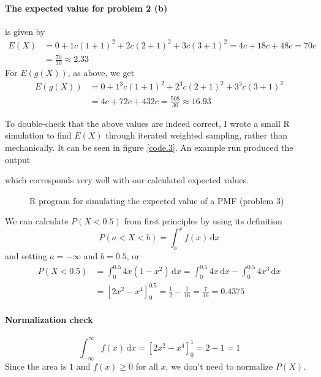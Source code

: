 \documentclass[a4paper,english,12pt]{article}
\begin{document}
\paragraph{The expected value for problem 2 (b)} is given by
\begin{align*}
  E(X) &=
    0 +
    1 c(1+1)^2 +
    2 c(2+1)^2 +
    3 c(3+1)^2 =
    4c + 18c + 48c = 70c \\
    &= \frac{70}{30} \approx 2.33
\end{align*}
For $E(g(X))$, as above, we get
\begin{align*}
  E(g(X)) &=
    0 +
    1^3 c(1+1)^2 +
    2^3 c(2+1)^2 +
    3^3 c(3+1)^2 \\
    &=  4c + 72c + 432c = \frac{508}{30} \approx 16.93
\end{align*}

To double-check that the above values are indeed correct, I wrote a small R
simulation to find $E(X)$ through iterated weighted sampling, rather than
mechanically. It can be seen in figure \vref{code.3}.
%
An example run produced the output

which corresponds very well with our calculated expected values.

\begin{figure}[t]
  
  \caption{R program for simulating the expected value of a PMF (problem 3)}
  \label{code.3}
\end{figure}


We can calculate $P(X < 0.5)$ from first principles by using its definition
\begin{equation}
  \label{eq.4a}
  P(a < X < b) = \int_b^x{f(x)\, \mathrm{d} x}
\end{equation} and setting $a=-\infty$ and $b=0.5$, or
\begin{align*}
  P(X < 0.5) &=
    \int_0^{0.5} 4x(1-x^2)\, \mathrm{d} x =
    \int_0^{0.5} 4x\, \mathrm{d} x - \int_0^{0.5} 4x^3\, \mathrm{d} x \\
  &=
    \left[2x^2 - x^4 \right]_0^{0.5}
  = \frac{1}{2} - \frac{1}{16} = \frac{7}{16} = 0.4375
\end{align*}
\paragraph{Normalization check}
\[
  \int_{-\infty}^{\infty} f(x)\, \mathrm{d} x =
    \left[ 2x^2 - x^4 \right]_{0}^{1} = 2 - 1 = 1
\]%
Since the area is $1$ and $f(x) \geqslant 0$ for all
$x$, we don't need to normalize $P(X)$.
\end{document}
